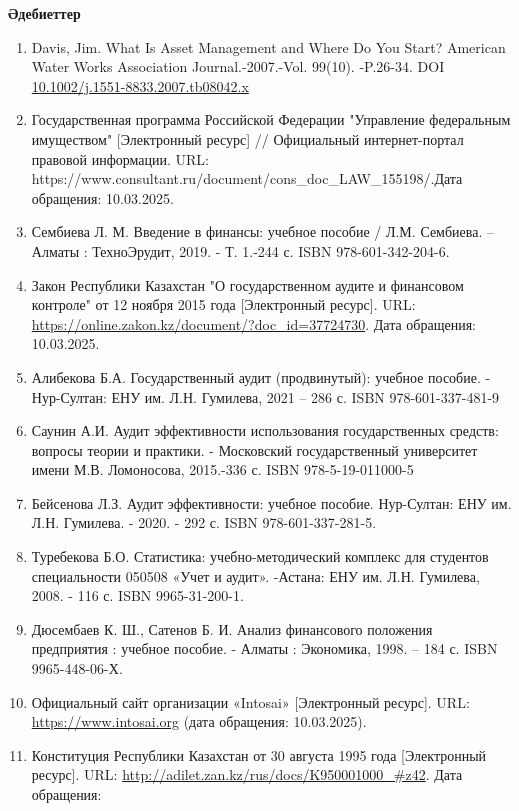 {\bfseries Әдебиеттер}

\begin{enumerate}
\def\labelenumi{\arabic{enumi}.}
\item
  Davis, Jim. What Is Asset Management and Where Do You Start? American
  Water Works Association Journal.-2007.-Vol. 99(10). -P.26-34. DOI
  \href{http://dx.doi.org/10.1002/j.1551-8833.2007.tb08042.x}{10.1002/j.1551-8833.2007.tb08042.x}
\item
  Государственная программа Российской Федерации "Управление федеральным
  имуществом" {[}Электронный ресурс{]} // Официальный интернет-портал
  правовой информации. URL:
  https://www.consultant.ru/document/cons\_doc\_LAW\_155198/.Дата
  обращения: 10.03.2025.
\item
  Сембиева Л. М. Введение в финансы: учебное пособие / Л.М. Сембиева. --
  Алматы : ТехноЭрудит, 2019. - Т. 1.-244 с. ISBN 978-601-342-204-6.
\item
  Закон Республики Казахстан "О государственном аудите и финансовом
  контроле" от 12 ноября 2015 года {[}Электронный ресурс{]}. URL:
  \url{https://online.zakon.kz/document/?doc_id=37724730}. Дата
  обращения: 10.03.2025.
\item
  Алибекова Б.А. Государственный аудит (продвинутый): учебное пособие. -
  Нур-Султан: ЕНУ им. Л.Н. Гумилева, 2021 -- 286 с. ISBN
  978-601-337-481-9
\item
  Саунин А.И. Аудит эффективности использования государственных средств:
  вопросы теории и практики. - Московский государственный университет
  имени М.В. Ломоносова, 2015.-336 с. ISBN 978-5-19-011000-5
\item
  Бейсенова Л.З. Аудит эффективности: учебное пособие. Нур-Султан: ЕНУ
  им. Л.Н. Гумилева. - 2020. - 292 с. ISBN 978-601-337-281-5.
\item
  Туребекова Б.О. Статистика: учебно-методический комплекс для студентов
  специальности 050508 «Учет и аудит». -Астана: ЕНУ им. Л.Н. Гумилева,
  2008. - 116 с. ISBN 9965-31-200-1.
\item
  Дюсембаев К. Ш., Сатенов Б. И. Анализ финансового положения
  предприятия : учебное пособие. - Алматы : Экономика, 1998. -- 184 с.
  ISBN 9965-448-06-Х.
\item
  Официальный сайт организации «Intosai» {[}Электронный ресурс{]}. URL:
  \url{https://www.intosai.org} (дата обращения: 10.03.2025).
\item
  Конституция Республики Казахстан от 30 августа 1995 года
  {[}Электронный ресурс{]}. URL:
  \url{http://adilet.zan.kz/rus/docs/K950001000_\#z42}. Дата обращения:

\end{enumerate}
